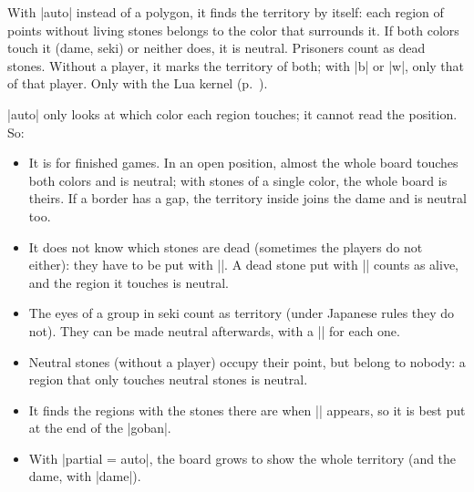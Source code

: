 	\begin{command}{\territory{}}
		With |auto| instead of a polygon, it finds the territory by itself: each region of points without living stones belongs to the color that surrounds it. If both colors touch it (dame, seki) or neither does, it is neutral. Prisoners count as dead stones. Without a player, it marks the territory of both; with |b| or |w|, only that of that player. Only with the Lua kernel (p.~\pageref{subsec:kernel}).

		\begin{codeexample}[width=4.75cm]
			\begin{goban}[label = {at = {above, left}}]

			\end{goban}
		\end{codeexample}

		|auto| only looks at which color each region touches; it cannot read the position. So:
		\begin{itemize}
			\item It is for finished games. In an open position, almost the whole board touches both colors and is neutral; with stones of a single color, the whole board is theirs. If a border has a gap, the territory inside joins the dame and is neutral too.
			\item It does not know which stones are dead (sometimes the players do not either): they have to be put with |\prisoners|. A dead stone put with |\stones| counts as alive, and the region it touches is neutral.
			\item The eyes of a group in seki count as territory (under Japanese rules they do not). They can be made neutral afterwards, with a |\territory[n]| for each one.
			\item Neutral stones (without a player) occupy their point, but belong to nobody: a region that only touches neutral stones is neutral.
			\item It finds the regions with the stones there are when |\territory| appears, so it is best put at the end of the |goban|.
			\item With |partial = auto|, the board grows to show the whole territory (and the dame, with |dame|).
		\end{itemize}
	\end{command}

